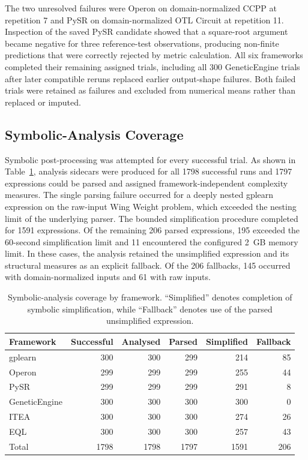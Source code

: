\documentclass[12pt,oneside,bibtotoc,liststotoc]{scrbook}
\begin{document}
The two unresolved failures were Operon on domain-normalized CCPP at repetition 7 and PySR on domain-normalized OTL Circuit at repetition 11. Inspection of the saved PySR candidate showed that a square-root argument became negative for three reference-test observations, producing non-finite predictions that were correctly rejected by metric calculation. All six frameworks completed their remaining assigned trials, including all 300 GeneticEngine trials after later compatible reruns replaced earlier output-shape failures. Both failed trials were retained as failures and excluded from numerical means rather than replaced or imputed.

\subsection{Symbolic-Analysis Coverage}

Symbolic post-processing was attempted for every successful trial. As shown in Table~\ref{tab:results-symbolic-coverage}, analysis sidecars were produced for all 1798 successful runs and 1797 expressions could be parsed and assigned framework-independent complexity measures. The single parsing failure occurred for a deeply nested gplearn expression on the raw-input Wing Weight problem, which exceeded the nesting limit of the underlying parser. The bounded simplification procedure completed for 1591 expressions. Of the remaining 206 parsed expressions, 195 exceeded the 60-second simplification limit and 11 encountered the configured 2~GB memory limit. In these cases, the analysis retained the unsimplified expression and its structural measures as an explicit fallback. Of the 206 fallbacks, 145 occurred with domain-normalized inputs and 61 with raw inputs.

\begin{table}[H]
    \centering
    \caption{Symbolic-analysis coverage by framework. ``Simplified'' denotes completion of symbolic simplification, while ``Fallback'' denotes use of the parsed unsimplified expression.}
    \label{tab:results-symbolic-coverage}
    \begin{tabular}{lrrrrr}
        \toprule
        Framework & Successful & Analysed & Parsed & Simplified & Fallback \\
        \midrule
        gplearn & 300 & 300 & 299 & 214 & 85 \\
        Operon & 299 & 299 & 299 & 255 & 44 \\
        PySR & 299 & 299 & 299 & 291 & 8 \\
        GeneticEngine & 300 & 300 & 300 & 300 & 0 \\
        ITEA & 300 & 300 & 300 & 274 & 26 \\
        EQL & 300 & 300 & 300 & 257 & 43 \\
        \midrule
        Total & 1798 & 1798 & 1797 & 1591 & 206 \\
        \bottomrule
    \end{tabular}
\end{table}
\end{document}
